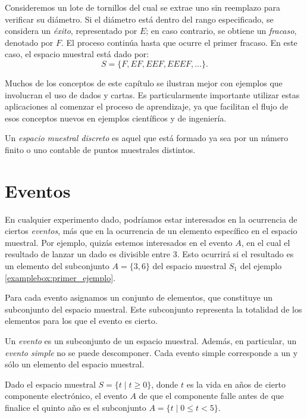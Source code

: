 \newpage

\begin{examplebox}{}{}
    Consideremos un lote de tornillos del cual se extrae uno sin reemplazo para verificar su diámetro. Si el diámetro está dentro del rango especificado, se considera un \emph{éxito}, representado por $E$; en caso contrario, se obtiene un \emph{fracaso}, denotado por $F$. El proceso continúa hasta que ocurre el primer fracaso. En este caso, el espacio muestral está dado por:
    $$S = \{ F, EF, EEF, EEEF, \dots \}.$$
\end{examplebox}

Muchos de los conceptos de este capítulo se ilustran mejor con ejemplos que involucran el uso de dados y cartas. Es particularmente importante utilizar estas aplicaciones al comenzar el proceso de aprendizaje, ya que facilitan el flujo de esos conceptos nuevos en ejemplos científicos y de ingeniería.

\begin{definicion}{}{}
    Un \emph{espacio muestral discreto} es aquel que está formado ya sea por un número finito o uno contable de puntos muestrales distintos.
\end{definicion}

\section{Eventos}

En cualquier experimento dado, podríamos estar interesados en la ocurrencia de ciertos \emph{eventos}, más que en la ocurrencia de un elemento específico en el espacio muestral. Por ejemplo, quizás estemos interesados en el evento $A$, en el cual el resultado de lanzar un dado es divisible entre 3. Esto ocurrirá si el resultado es un elemento del subconjunto $A = \{3, 6\}$ del espacio muestral $S_1$ del ejemplo \ref{examplebox:primer_ejemplo}.

Para cada evento asignamos un conjunto de elementos, que constituye un
subconjunto del espacio muestral. Este subconjunto representa la totalidad de los elementos para los que el evento es cierto.

\begin{definicion}{}{}
    Un \emph{evento} es un subconjunto de un espacio muestral. Además, en particular, un \emph{evento simple} no se puede descomponer. Cada evento simple corresponde a un y sólo un elemento del espacio muestral.
\end{definicion}

\begin{examplebox}{}{}
    Dado el espacio muestral $S = \{t \mid t \geq 0\}$, donde $t$ es la vida en años de cierto componente electrónico, el evento $A$ de que el componente falle antes de que finalice el quinto año es el subconjunto $A = \{t \mid 0 \leq t < 5\}$.
\end{examplebox}


